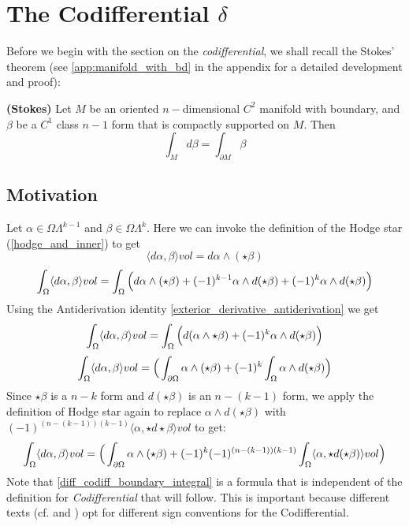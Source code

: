 \section{The Codifferential $\delta$}
Before we begin with the section on the \emph{codifferential}, we shall recall the Stokes' theorem (see \ref{app:manifold_with_bd} in the appendix for a detailed development and proof):
\begin{theorem}
{\textbf{(Stokes)} Let $M$ be an oriented $n-$dimensional $C^2$ manifold with boundary, and $\beta$ be a $C^1$ class $n-1$ form that is compactly supported on $M$. Then \begin{equation}
    \int_M d\beta=\int_{\partial M}\beta
\end{equation} }
    
\end{theorem}

\subsection{Motivation}
Let $\alpha \in \Omega\Lambda^{k-1}$ and $\beta \in \Omega\Lambda^k$. Here we can invoke the definition of the Hodge star (\ref{hodge_and_inner}) to get $$\langle d\alpha,\beta\rangle vol=d\alpha \wedge (\star \beta) $$
$$\int_{\Omega} \langle d\alpha,\beta\rangle vol=\int_{\Omega} \Big{(}d\alpha \wedge (\star \beta)+(-1)^{k-1}\alpha \wedge d(\star \beta)+(-1)^k \alpha \wedge d(\star \beta) \Big{)}$$
Using the Antiderivation identity \ref{exterior_derivative_antiderivation}
we get 
\begin{equation}
\int_{\Omega} \langle d\alpha,\beta\rangle vol=\int_{\Omega} \Big{(}d(\alpha \wedge \star \beta)+(-1)^k \alpha \wedge d(\star \beta) \Big{)}\end{equation}
$$\int_{\Omega} \langle d\alpha,\beta\rangle vol= \Big{(}\int_{\partial\Omega} \alpha \wedge (\star \beta)+(-1)^k\int_{\Omega} \alpha \wedge d(\star \beta) \Big{)} $$
Since $\star \beta$ is a $n-k$ form and $d(\star \beta)$ is an $n-(k-1)$ form, we apply the definition of Hodge star again to replace $\alpha \wedge d(\star \beta)$ with $(-1)^{(n-(k-1))(k-1)}\langle \alpha,\star d\star \beta \rangle vol$ to get: 
\begin{equation}\label{diff_codiff_boundary_integral}\int_{\Omega} \langle d\alpha,\beta\rangle vol= \Big{(}\int_{\partial\Omega} \alpha \wedge (\star \beta)+(-1)^k(-1)^{(n-(k-1))(k-1)}\int_{\Omega} \langle \alpha, \star d(\star \beta) \rangle vol\Big{)} \end{equation}
Note that \eqref{diff_codiff_boundary_integral} is a formula that is independent of the definition for \emph{Codifferential} that will follow. This is important because different texts (cf. \cite{Jost2017} and \cite{CsatoDacorognaKneuss2012}) opt for different sign conventions for the Codifferential.

